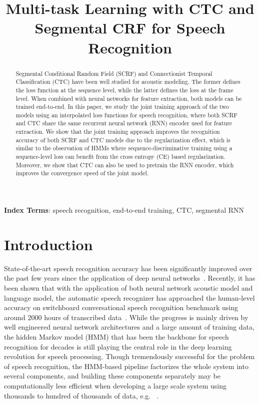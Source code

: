 \documentclass[a4paper]{article}
\title{Multi-task Learning with CTC and Segmental CRF for Speech Recognition}
\begin{document}
\maketitle
% 
\begin{abstract}
Segmental Conditional Random Field (SCRF) and Connectionist Temporal Classification (CTC) have been well studied for acoustic modeling. The former defines the loss function at the sequence level, while the latter defines the loss at the frame level. When combined with neural networks for feature extraction, both models can be trained end-to-end. In this paper, we study the joint training approach of the two models using an interpolated loss functions for speech recognition, where both SCRF and CTC share the same recurrent neural network (RNN) encoder used for feature extraction. We show that the joint training approach improves the recognition accuracy of both SCRF and CTC models due to the regularization effect, which is similar to the observation of HMMs where sequence-discriminative training using a sequence-level loss can benefit from the cross entropy (CE) based regularization. Moreover, we show that CTC can also be used to pretrain the RNN encoder, which improves the convergence speed of the joint model. 
\end{abstract}
\noindent\textbf{Index Terms}: speech recognition, end-to-end training, CTC, segmental RNN

\section{Introduction}

State-of-the-art speech recognition accuracy has been significantly improved over the past few years since the application of deep neural networks~\cite{hinton2012deep, seide2011conversational}. Recently, it has been shown that with the application of both neural network acoustic model and language model, the automatic speech recognizer has approached the human-level accuracy on switchboard conversational speech recognition benchmark using around 2000 hours of transcribed data~\cite{xiong2016}. While the progress is mainly driven by well engineered neural network architectures and a large amount of training data, the hidden Markov model (HMM) that has been the backbone for speech recognition for decades is still playing the central role in the deep learning revolution for speech processing. Though tremendously successful for the problem of speech recognition, the HMM-based pipeline factorizes the whole system into several components, and building these components separately may be computationally less efficient when developing a large scale system using thousands to hundred of thousands of data, e.g. ~\cite{soltau2016neural}.
\end{document}
